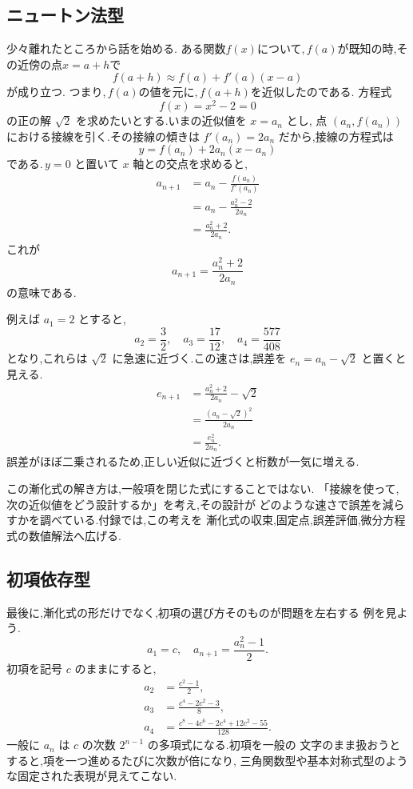 \subsection{ニュートン法型}

少々離れたところから話を始める.
ある関数$f(x)$について,\,$f(a)$が既知の時,その近傍の点$x=a+h$で
\[
  f(a+h) \approx f(a)+f'(a)(x-a)
\]
が成り立つ.
つまり,\,$f(a)$の値を元に,\,$f(a+h)$を近似したのである.
方程式
\[
  f(x)=x^2-2=0
\]
の正の解 $\sqrt{2}$ を求めたいとする.いまの近似値を $x=a_n$ とし,
点 $(a_n,f(a_n))$ における接線を引く.その接線の傾きは
$f'(a_n)=2a_n$ だから,接線の方程式は
\[
  y=f(a_n)+2a_n(x-a_n)
\]
である.\,$y=0$ と置いて $x$ 軸との交点を求めると,
\begin{align*}
  a_{n+1}
    &=a_n-\frac{f(a_n)}{f'(a_n)}\\
    &=a_n-\frac{a_n^2-2}{2a_n}\\
    &=\frac{a_n^2+2}{2a_n}.
\end{align*}
これが
\[
  a_{n+1}=\frac{a_n^2+2}{2a_n}
\]
の意味である.

例えば $a_1=2$ とすると,
\[
  a_2=\frac{3}{2},
  \quad
  a_3=\frac{17}{12},
  \quad
  a_4=\frac{577}{408}
\]
となり,これらは $\sqrt{2}$ に急速に近づく.この速さは,誤差を
$e_n=a_n-\sqrt{2}$ と置くと見える.
\begin{align*}
  e_{n+1}
    &=\frac{a_n^2+2}{2a_n}-\sqrt{2}\\
    &=\frac{(a_n-\sqrt{2})^2}{2a_n}\\
    &=\frac{e_n^2}{2a_n}.
\end{align*}
誤差がほぼ二乗されるため,正しい近似に近づくと桁数が一気に増える.

この漸化式の解き方は,一般項を閉じた式にすることではない.
「接線を使って,次の近似値をどう設計するか」を考え,その設計が
どのような速さで誤差を減らすかを調べている.付録では,この考えを
漸化式の収束,固定点,誤差評価,微分方程式の数値解法へ広げる.

\subsection{初項依存型}

最後に,漸化式の形だけでなく,初項の選び方そのものが問題を左右する
例を見よう.
\[
  a_1=c,
  \quad
  a_{n+1}=\frac{a_n^2-1}{2}.
\]
初項を記号 $c$ のままにすると,
\begin{align*}
  a_2&=\frac{c^2-1}{2},\\
  a_3&=\frac{c^4-2c^2-3}{8},\\
  a_4&=\frac{c^8-4c^6-2c^4+12c^2-55}{128}.
\end{align*}
一般に $a_n$ は $c$ の次数 $2^{n-1}$ の多項式になる.初項を一般の
文字のまま扱おうとすると,項を一つ進めるたびに次数が倍になり,
三角関数型や基本対称式型のような固定された表現が見えてこない.

